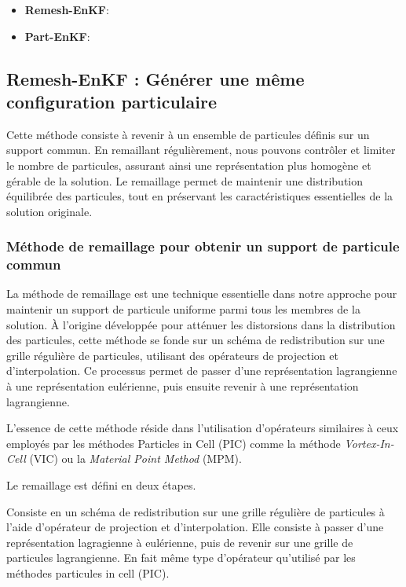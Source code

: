 \begin{itemize}
    \item \textbf{Remesh-EnKF}: \\
    \item \textbf{Part-EnKF}: \\
\end{itemize}

\subsection{Remesh-EnKF : Générer une même configuration particulaire}

Cette méthode consiste à revenir à un ensemble de particules définis sur un support commun. En remaillant régulièrement, nous pouvons contrôler et limiter le nombre de particules, assurant ainsi une représentation plus homogène et gérable de la solution. Le remaillage permet de maintenir une distribution équilibrée des particules, tout en préservant les caractéristiques essentielles de la solution originale.

\subsubsection*{Méthode de remaillage pour obtenir un support de particule commun}

La méthode de remaillage est une technique essentielle dans notre approche pour maintenir un support de particule uniforme parmi tous les membres de la solution. À l'origine développée pour atténuer les distorsions dans la distribution des particules, cette méthode se fonde sur un schéma de redistribution sur une grille régulière de particules, utilisant des opérateurs de projection et d'interpolation. Ce processus permet de passer d'une représentation lagrangienne à une représentation eulérienne, puis ensuite revenir à une représentation lagrangienne.

L'essence de cette méthode réside dans l'utilisation d'opérateurs similaires à ceux employés par les méthodes Particles in Cell (PIC) comme la méthode \textit{Vortex-In-Cell} (VIC) ou la \textit{Material Point Method} (MPM).

Le remaillage est défini en deux étapes.

Consiste en un schéma de redistribution sur une grille régulière de particules à l'aide d'opérateur de projection et d'interpolation. Elle consiste à passer d'une représentation lagragienne à eulérienne, puis de revenir sur une grille de particules lagrangienne. En fait même type d'opérateur qu'utilisé par les méthodes particules in cell (PIC).

